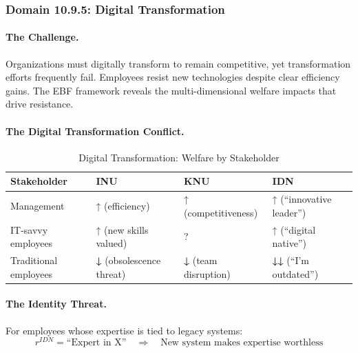 \subsubsection{Domain 10.9.5: Digital Transformation}
\label{subsubsec:digital-transformation}

\paragraph{The Challenge.}
Organizations must digitally transform to remain competitive, yet transformation
efforts frequently fail. Employees resist new technologies despite clear
efficiency gains. The EBF framework reveals the multi-dimensional welfare
impacts that drive resistance.

\paragraph{The Digital Transformation Conflict.}

\begin{table}[htbp]
\centering
\caption{Digital Transformation: Welfare by Stakeholder}
\label{tab:digital-welfare}
\renewcommand{\arraystretch}{1.3}
\begin{tabular}{@{}llll@{}}
\toprule
\textbf{Stakeholder} & \textbf{INU} & \textbf{KNU} & \textbf{IDN} \\
\midrule
Management & ↑ (efficiency) & ↑ (competitiveness) & ↑ (``innovative leader'') \\
IT-savvy employees & ↑ (new skills valued) & ? & ↑ (``digital native'') \\
Traditional employees & \textbf{↓} (obsolescence threat) & \textbf{↓} (team disruption) & \textbf{↓↓} (``I'm outdated'') \\
\bottomrule
\end{tabular}
\end{table}

\paragraph{The Identity Threat.}
For employees whose expertise is tied to legacy systems:
\begin{equation}
r^{IDN} = \text{``Expert in X''} \quad \Rightarrow \quad \text{New system makes expertise worthless}
\end{equation}

